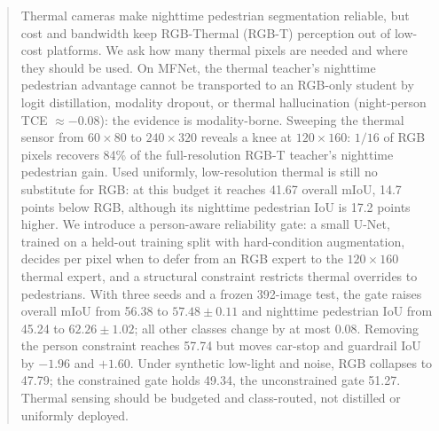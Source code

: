 \begin{abstract}
Thermal cameras make nighttime pedestrian segmentation reliable, but cost and bandwidth
keep RGB-Thermal (RGB-T) perception out of low-cost platforms. We ask how many thermal
pixels are needed and where they should be used. On MFNet, the thermal teacher's
nighttime pedestrian advantage cannot be transported to an RGB-only student by logit
distillation, modality dropout, or thermal hallucination (night-person TCE $\approx
-0.08$): the evidence is modality-borne. Sweeping the thermal sensor from $60\times80$ to
$240\times320$ reveals a knee at $120\times160$: $1/16$ of RGB pixels recovers 84\% of
the full-resolution RGB-T teacher's nighttime pedestrian gain. Used uniformly,
low-resolution thermal is still no substitute for RGB: at this budget it reaches 41.67
overall mIoU, 14.7 points below RGB, although its nighttime pedestrian IoU is 17.2 points
higher. We introduce a person-aware reliability gate: a small U-Net, trained on a
held-out training split with hard-condition augmentation, decides per pixel when to defer
from an RGB expert to the $120\times160$ thermal expert, and a structural constraint
restricts thermal overrides to pedestrians. With three seeds and a frozen 392-image test,
the gate raises overall mIoU from 56.38 to $57.48\pm0.11$ and nighttime pedestrian IoU
from 45.24 to $62.26\pm1.02$; all other classes change by at most 0.08. Removing the
person constraint reaches 57.74 but moves car-stop and guardrail IoU by $-1.96$ and
$+1.60$. Under synthetic low-light and noise, RGB collapses to 47.79; the constrained gate
holds 49.34, the unconstrained gate 51.27. Thermal sensing should be budgeted and
class-routed, not distilled or uniformly deployed.
\end{abstract}